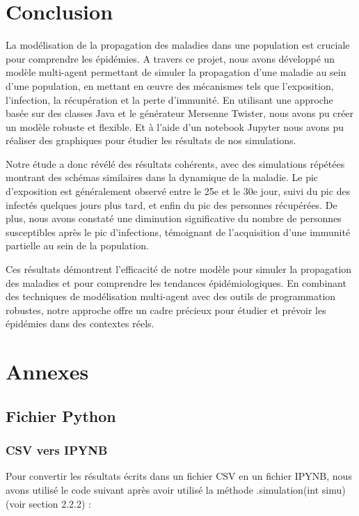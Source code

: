 \documentclass[french]{article}
\begin{document}
\section{Conclusion}
La modélisation de la propagation des maladies dans une population est cruciale pour comprendre les épidémies. A travers ce projet, nous avons développé un modèle multi-agent permettant de simuler la propagation d'une maladie au sein d'une population, en mettant en œuvre des mécanismes tels que l'exposition, l'infection, la récupération et la perte d'immunité. En utilisant une approche basée sur des classes Java et le générateur Mersenne Twister, nous avons pu créer un modèle robuste et flexible. Et à l'aide d'un notebook Jupyter nous avons pu réaliser des graphiques pour étudier les résultats de nos simulations.

Notre étude a donc révélé des résultats cohérents, avec des simulations répétées montrant des schémas similaires dans la dynamique de la maladie. Le pic d'exposition est généralement observé entre le 25e et le 30e jour, suivi du pic des infectés quelques jours plus tard, et enfin du pic des personnes récupérées. De plus, nous avons constaté une diminution significative du nombre de personnes susceptibles après le pic d'infections, témoignant de l'acquisition d'une immunité partielle au sein de la population.

Ces résultats démontrent l'efficacité de notre modèle pour simuler la propagation des maladies et pour comprendre les tendances épidémiologiques. En combinant des techniques de modélisation multi-agent avec des outils de programmation robustes, notre approche offre un cadre précieux pour étudier et prévoir les épidémies dans des contextes réels.

\newpage

\section{Annexes}

\subsection{Fichier Python}
\subsubsection{CSV vers IPYNB}

Pour convertir les résultats écrits dans un fichier CSV en un fichier IPYNB, nous avons utilisé le code suivant après avoir utilisé la méthode .simulation(int simu) (voir section 2.2.2) :\\
\end{document}
